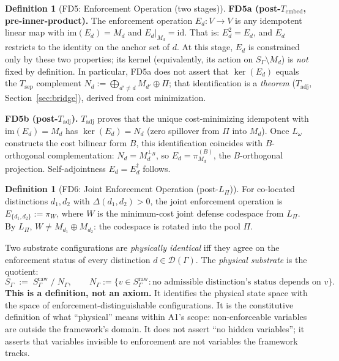 \documentclass[11pt,a4paper]{article}
\theoremstyle{definition}
\newtheorem{definition}[theorem]{Definition}
\newcommand{\im}{\mathrm{im}}
\begin{document}
\begin{definition}[FD5: Enforcement Operation (two stages)]
\textbf{FD5a (post-$T_{\mathrm{embed}}$, pre-inner-product).}  The enforcement operation $E_d: V \to V$ is any idempotent linear map with $\im(E_d) = M_d$ and $E_d|_{M_d} = \mathrm{id}$.  That is: $E_d^2 = E_d$, and $E_d$ restricts to the identity on the anchor set of $d$.  At this stage, $E_d$ is constrained only by these two properties; its kernel (equivalently, its action on $S_\Gamma \setminus M_d$) is \emph{not} fixed by definition.  In particular, FD5a does not assert that $\ker(E_d)$ equals the $T_{\mathrm{sep}}$ complement $N_d := \bigoplus_{d' \ne d} M_{d'} \oplus \Pi$; that identification is a \emph{theorem} ($T_{\mathrm{adj}}$, Section~\ref{sec:bridge}), derived from cost minimization.

\smallskip\noindent
\textbf{FD5b (post-$T_{\mathrm{adj}}$).}  $T_{\mathrm{adj}}$ proves that the unique cost-minimizing idempotent with $\im(E_d) = M_d$ has $\ker(E_d) = N_d$ (zero spillover from $\Pi$ into $M_d$).  Once $L_\omega$ constructs the cost bilinear form $B$, this identification coincides with $B$-orthogonal complementation: $N_d = M_d^{\perp_B}$, so $E_d = \pi_{M_d}^{(B)}$, the $B$-orthogonal projection.  Self-adjointness $E_d = E_d^\dagger$ follows.
\end{definition}

\begin{definition}[FD6: Joint Enforcement Operation (post-$L_\Pi$)]
For co-located distinctions $d_1, d_2$ with $\Delta(d_1, d_2) > 0$, the joint enforcement operation is $E_{\{d_1,d_2\}} := \pi_W$, where $W$ is the minimum-cost joint defense codespace from $L_\Pi$.  By $L_\Pi$, $W \ne M_{d_1} \oplus M_{d_2}$: the codespace is rotated into the pool $\Pi$.
\end{definition}

\begin{tcolorbox}[apfbox, title={SP: Substrate Faithfulness (constitutive principle)}]
Two substrate configurations are \emph{physically identical} iff they agree on the enforcement status of every distinction $d \in \mathcal{D}(\Gamma)$.  The \emph{physical substrate} is the quotient:
\[
S_\Gamma \;:=\; S_\Gamma^{\mathrm{raw}} \;/\; N_\Gamma, \qquad N_\Gamma := \{v \in S_\Gamma^{\mathrm{raw}} : \text{no admissible distinction's status depends on } v\}.
\]
\textbf{This is a definition, not an axiom.}  It identifies the physical state space with the space of enforcement-distinguishable configurations.  It is the constitutive definition of what ``physical'' means within A1's scope: non-enforceable variables are outside the framework's domain.  It does not assert ``no hidden variables''; it asserts that variables invisible to enforcement are not variables the framework tracks.
\end{tcolorbox}
\end{document}

